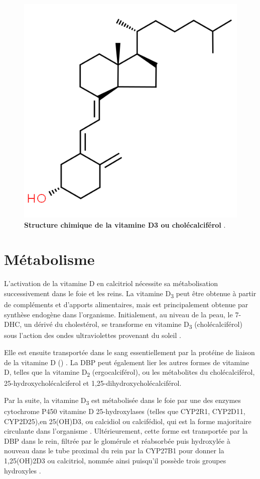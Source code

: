 \documentclass[
  a4paper,
  DIV=11,
  numbers=noendperiod,
  listof=totoc]{scrreprt}
\begin{document}
\begin{figure}
\centering
\includegraphics[width=0.7\columnwidth]{figures/cholecalciferol-chemspider.png} 
\caption[Structure chimique de la vitamine D3 ou cholécalciférol.]{\textbf{Structure chimique de la vitamine D3 ou cholécalciférol} \autocite{chemspider.2023}.}
\label{fig:vitd3}
\end{figure}

\section{Métabolisme}\label{sec-metabolisme}

L'activation de la vitamine D en calcitriol nécessite sa métabolisation
successivement dans le foie et les reins. La vitamine D\textsubscript{3}
peut être obtenue à partir de compléments et d'apports alimentaires,
mais est principalement obtenue par synthèse endogène dans l'organisme.
Initialement, au niveau de la peau, le \ac{7-DHC}, un dérivé du
cholestérol, se transforme en vitamine D\textsubscript{3}
(cholécalciférol) sous l'action des ondes ultraviolettes provenant du
soleil \autocite{Bikle.2014}.

Elle est ensuite transportée dans le sang essentiellement par la
protéine de liaison de la vitamine D ()
\autocite{Christakos.2010,Chun.2012}. La \ac{DBP} peut également lier
les autres formes de vitamine D, telles que la vitamine
D\textsubscript{2} (ergocalciférol), ou les métabolites du
cholécalciférol, 25-hydroxycholécalciferol et
1,25-dihydroxycholécalciférol.

Par la suite, la vitamine D\textsubscript{3} est métabolisée dans le
foie par une des enzymes cytochrome P450 vitamine D 25-hydroxylases
(telles que CYP2R1, CYP2D11, CYP2D25),en \ac{25(OH)D3}, ou calcidiol ou
calcifédiol, qui est la forme majoritaire circulante dans l'organisme
\autocite{Norman.2008,Christakos.2010}. Ultérieurement, cette forme est
transportée par la \ac{DBP} dans le rein, filtrée par le glomérule et
réabsorbée puis hydroxylée à nouveau dans le tube proximal du rein par
la \ac{CYP27B1} pour donner la \ac{1,25(OH)2D3} ou calcitriol, nommée
ainsi puisqu'il possède trois groupes hydroxyles
\autocite{Norman.2008,Dankers.2017}.
\end{document}
